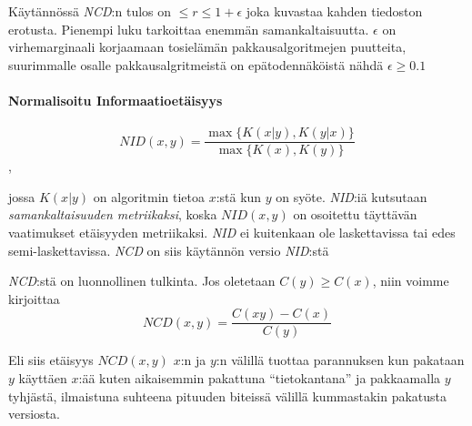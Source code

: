 \documentclass[finnish]{tktltiki2}
\theoremstyle{definition}
\theoremstyle{remark}
\begin{document}
    Käytännössä \emph{NCD}:n tulos on $ \leq r \leq 1+ \epsilon$ joka kuvastaa kahden tiedoston erotusta. Pienempi luku tarkoittaa enemmän samankaltaisuutta. $\epsilon$ on virhemarginaali korjaamaan tosielämän pakkausalgoritmejen puutteita, suurimmalle osalle pakkausalgritmeistä on epätodennäköistä nähdä $\epsilon \geq 0.1$

  \paragraph{Normalisoitu Informaatioetäisyys} %
  \label{par:normalisoitu_informaatioet_isyys}
    $$ NID(x,y) = \frac{ \max\{K{(x|y)},K{(y|x)}\} }{ \max \{K(x),K(y)\}} $$,

    jossa $K(x|y)$ on algoritmin tietoa $x$:stä kun $y$ on syöte. \emph{NID}:iä kutsutaan \emph{samankaltaisuuden metriikaksi}, koska $NID(x,y)$ on osoitettu täyttävän vaatimukset etäisyyden metriikaksi. \emph{NID} ei kuitenkaan ole laskettavissa tai edes semi-laskettavissa. \emph{NCD} on siis käytännön versio \emph{NID}:stä

  \emph{NCD}:stä on luonnollinen tulkinta. Jos oletetaan $C(y) \geq C(x)$, niin voimme kirjoittaa
  $$ NCD(x,y) = \frac{C(xy)-C(x)}{C(y)} $$

  Eli siis etäisyys $NCD(x,y)$ $x$:n ja $y$:n välillä tuottaa parannuksen kun pakataan $y$ käyttäen $x$:ää kuten aikaisemmin pakattuna ``tietokantana'' ja pakkaamalla $y$ tyhjästä, ilmaistuna suhteena pituuden biteissä välillä kummastakin pakatusta versiosta.

%
%

%

% 





%
\end{document}
